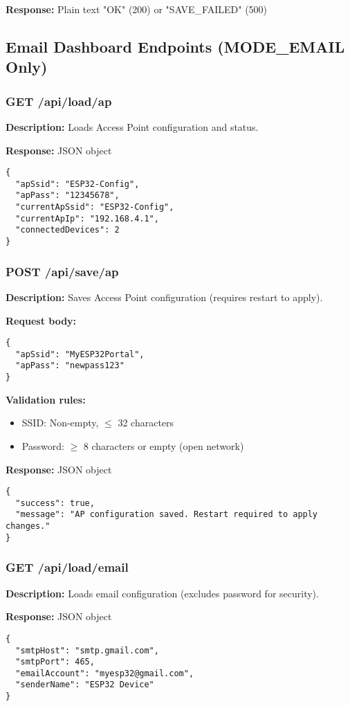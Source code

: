 \documentclass[11pt,a4paper]{article}
\begin{document}
\textbf{Response:} Plain text "OK" (200) or "SAVE\_FAILED" (500)

\subsection{Email Dashboard Endpoints (MODE\_EMAIL Only)}

\subsubsection{GET /api/load/ap}
\textbf{Description:} Loads Access Point configuration and status.

\textbf{Response:} JSON object
\begin{verbatim}
{
  "apSsid": "ESP32-Config",
  "apPass": "12345678",
  "currentApSsid": "ESP32-Config",
  "currentApIp": "192.168.4.1",
  "connectedDevices": 2
}
\end{verbatim}

\subsubsection{POST /api/save/ap}
\textbf{Description:} Saves Access Point configuration (requires restart to apply).

\textbf{Request body:}
\begin{verbatim}
{
  "apSsid": "MyESP32Portal",
  "apPass": "newpass123"
}
\end{verbatim}

\textbf{Validation rules:}
\begin{itemize}[leftmargin=*]
  \item SSID: Non-empty, $\leq$ 32 characters
  \item Password: $\geq$ 8 characters or empty (open network)
\end{itemize}

\textbf{Response:} JSON object
\begin{verbatim}
{
  "success": true,
  "message": "AP configuration saved. Restart required to apply changes."
}
\end{verbatim}

\subsubsection{GET /api/load/email}
\textbf{Description:} Loads email configuration (excludes password for security).

\textbf{Response:} JSON object
\begin{verbatim}
{
  "smtpHost": "smtp.gmail.com",
  "smtpPort": 465,
  "emailAccount": "myesp32@gmail.com",
  "senderName": "ESP32 Device"
}
\end{verbatim}
\end{document}
